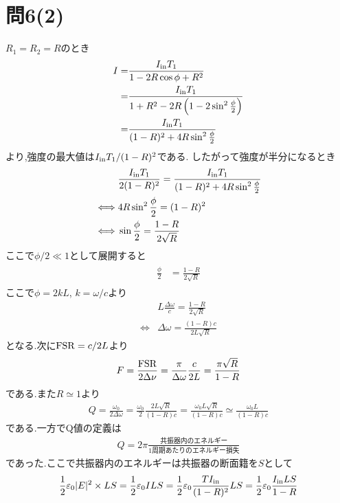 \documentclass[uplatex,a4j,11pt,dvipdfmx]{jsarticle}
\begin{document}
\section*{問6(2)}
$R_1=R_2=R$のとき
\begin{align}
  \begin{split}
    I=&\frac{I_{\rm in}T_1}{1-2R\cos\phi+R^2}\\
    =&\frac{I_{\rm in}T_1}{1+R^2-2R\left(1-2\sin^2\frac{\phi}{2}\right)}\\
    =&\frac{I_{\rm in}T_1}{(1-R)^2+4R\sin^2\frac{\phi}{2}}
  \end{split}
\end{align}
より,強度の最大値は$I_{\rm in}T_1/(1-R)^2$である.
したがって強度が半分になるとき
\begin{eqnarray}
  &\frac{I_{\rm in}T_1}{2(1-R)^2}=\frac{I_{\rm in}T_1}{(1-R)^2+4R\sin^2\frac{\phi}{2}}\nonumber\\
  \iff&4R\sin^2\frac{\phi}{2}=(1-R)^2\nonumber\\
  \iff&\sin\frac{\phi}{2}=\frac{1-R}{2\sqrt{R}}\nonumber\\
\end{eqnarray}
ここで$\phi/2\ll 1$として展開すると
\begin{align}
  \begin{split}
    \frac{\phi}{2}&=\frac{1-R}{2\sqrt{R}}
  \end{split}
\end{align}
ここで$\phi=2kL$, $k=\omega/c$より
\begin{eqnarray}
  &L\frac{\Delta\omega}{c}=\frac{1-R}{2\sqrt{R}}\nonumber\\
  \iff&\Delta\omega=\frac{(1-R)c}{2L\sqrt{R}}
\end{eqnarray}
となる.次に${\rm FSR}=c/2L$より
\begin{align}
  F=\frac{\rm FSR}{2\Delta\nu}=\frac{\pi}{\Delta\omega}\frac{c}{2L}=\frac{\pi\sqrt{R}}{1-R}
\end{align}
である.また$R\simeq 1$より
\begin{align}
  Q=\frac{\omega_0}{2\Delta\omega}=\frac{\omega_0}{2}\frac{2L\sqrt{R}}{(1-R)c}=\frac{\omega_0L\sqrt{R}}{(1-R)c}\simeq\frac{\omega_0L}{(1-R)c}
\end{align}
である.一方でQ値の定義は
\begin{align}
  Q=2\pi\frac{共振器内のエネルギー}{1周期あたりのエネルギー損失}
\end{align}
であった.ここで共振器内のエネルギーは共振器の断面籍を$S$として
\begin{align}
  \frac{1}{2}\varepsilon_0|E|^2\times LS=\frac{1}{2}\varepsilon_0ILS=\frac{1}{2}\varepsilon_0\frac{TI_{\rm in}}{(1-R)^2}LS=\frac{1}{2}\varepsilon_0\frac{I_{\rm in}LS}{1-R}
\end{align}
\end{document}
